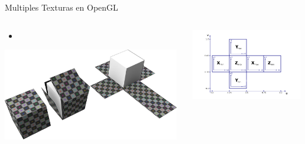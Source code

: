 \documentclass[aspectratio=169,compress]{beamer}
\begin{document}
\begin{frame}{Multiples Texturas en OpenGL}
\begin{columns}
\begin{column}{0.5\textwidth}
\begin{itemize}
\item 
\end{itemize}
    \begin{center}
        \includegraphics[width=0.98\textwidth]{FigsOpenGL/RefImgBoxmap2}
     \end{center}
\end{column}
\begin{column}{0.5\textwidth}
    \begin{center}
\includegraphics[width=0.98\textwidth]{FigsOpenGL/RefImgBoxmap}
     \end{center}
\end{column}
\end{columns}

\end{frame}
\end{document}
